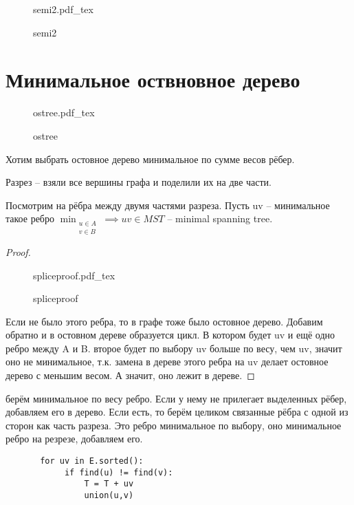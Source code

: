\documentclass{book}
\theoremstyle{definition}
\newcommand{\incfig}[1]{%
    \def\svgwidth{\columnwidth}
    {#1.pdf_tex}
}
\begin{document}
\begin{figure}[!ht]
    \centering
    \incfig{semi2}
    \caption{semi2}
    \label{fig:semi2}
\end{figure}

\section{Минимальное оствновное дерево}

\begin{figure}[!ht]
    \centering
    \incfig{ostree}
    \caption{ostree}
    \label{fig:ostree}
\end{figure}

Хотим выбрать остовное дерево минимальное по сумме весов рёбер.

\begin{lemma}
    [О разрезе]

    \begin{definition}
        Разрез -- взяли все вершины графа и поделили их на две части.
    \end{definition}

    Посмотрим на рёбра между двумя частями разреза. Пусть uv -- минимальное такое ребро $\min_{\substack{u\in A\\v\in B}} \implies uv\in MST$ -- minimal spanning tree.
\end{lemma}
\begin{proof}
\begin{figure}[!ht]
    \centering
    \incfig{spliceproof}
    \caption{spliceproof}
    \label{fig:spliceproof}
\end{figure}

Если не было этого ребра, то в графе тоже было остовное дерево. Добавим обратно и в остовном дереве образуется цикл. В котором будет uv и ещё одно ребро между A и B. второе будет по выбору uv больше по весу, чем uv, значит оно не минимальное, т.к. замена в дереве этого ребра на uv делает остовное дерево с меньшим весом. А значит, оно лежит в дереве.
\end{proof}

\begin{statement}
    берём минимальное по весу ребро. Если у нему не прилегает выделенных рёбер, добавляем его в дерево. Если есть, то берём целиком связанные рёбра с одной из сторон как часть разреза. Это ребро минимальное по выбору, оно минимальное ребро на резрезе, добавляем его.

    \begin{lstlisting}
       for uv in E.sorted():
            if find(u) != find(v):
                T = T + uv
                union(u,v)
    \end{lstlisting}
\end{statement}
\end{document}
